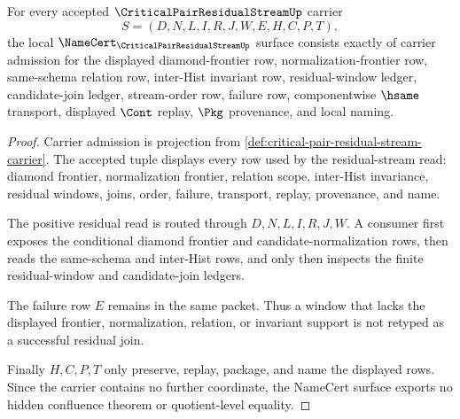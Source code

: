 \begin{theorem}
\label{thm:critical-pair-residual-stream-namecert-obligations}
For every accepted $\CriticalPairResidualStreamUp$ carrier
$$
S=(D,N,L,I,R,J,W,E,H,C,P,T),
$$
the local $\NameCert_{\CriticalPairResidualStreamUp}$ surface consists exactly of carrier admission for the displayed diamond-frontier row, normalization-frontier row, same-schema relation row, inter-Hist invariant row, residual-window ledger, candidate-join ledger, stream-order row, failure row, componentwise $\hsame$ transport, displayed $\Cont$ replay, $\Pkg$ provenance, and local naming.
\end{theorem}
\begin{proof}
Carrier admission is projection from \autoref{def:critical-pair-residual-stream-carrier}. The accepted tuple displays every row used by the residual-stream read: diamond frontier, normalization frontier, relation scope, inter-Hist invariance, residual windows, joins, order, failure, transport, replay, provenance, and name.

The positive residual read is routed through $D,N,L,I,R,J,W$. A consumer first exposes the conditional diamond frontier and candidate-normalization rows, then reads the same-schema and inter-Hist rows, and only then inspects the finite residual-window and candidate-join ledgers.

The failure row $E$ remains in the same packet. Thus a window that lacks the displayed frontier, normalization, relation, or invariant support is not retyped as a successful residual join.

Finally $H,C,P,T$ only preserve, replay, package, and name the displayed rows. Since the carrier contains no further coordinate, the NameCert surface exports no hidden confluence theorem or quotient-level equality.
\end{proof}

